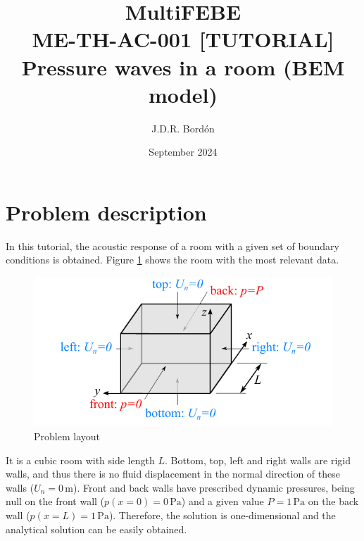 \documentclass[a4]{article}
\title{MultiFEBE \\ ME-TH-AC-001 [TUTORIAL] \\ Pressure waves in a room (BEM model)}
\author{J.D.R. Bordón}
\date{September 2024}
\begin{document}
\maketitle

\tableofcontents 

\section{Problem description}

In this tutorial, the acoustic response of a room with a given set of boundary conditions is obtained. Figure \ref{fig:problem} shows the room with the most relevant data. 

\begin{figure}[h]
\centering
\includegraphics[scale=1]{problem.pdf}
\caption{Problem layout\label{fig:problem}}
\end{figure}

It is a cubic room with side length $L$. Bottom, top, left and right walls are rigid walls, and thus there is no fluid displacement in the normal direction of these walls ($U_n=0\,\mathrm{m}$). Front and back walls have prescribed dynamic pressures, being null on the front wall ($p(x=0)=0\,\mathrm{Pa}$) and a given value $P=1\,\mathrm{Pa}$ on the back wall ($p(x=L)=1\,\mathrm{Pa}$). Therefore, the solution is one-dimensional and the analytical solution can be easily obtained.
 
\end{document}
